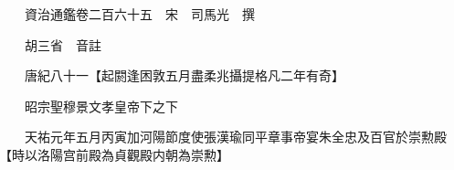










 


 
 


 

  
  
  
  
  





  
  
  
  
  
 
  

  

  
  
  



  

 
 

  
   




  

  
  


  　　資治通鑑卷二百六十五　宋　司馬光　撰

　　胡三省　音註

　　唐紀八十一【起閼逢困敦五月盡柔兆攝提格凡二年有奇】

　　昭宗聖穆景文孝皇帝下之下

　　天祐元年五月丙寅加河陽節度使張漢瑜同平章事帝宴朱全忠及百官於崇勲殿【時以洛陽宫前殿為貞觀殿内朝為崇勲】

